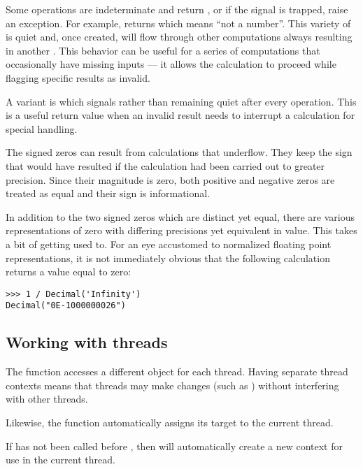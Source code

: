 Some operations are indeterminate and return , or if the
 signal is trapped, raise an exception.  For
example,  returns  which means ``not a number''.  This
variety of  is quiet and, once created, will flow through other
computations always resulting in another .  This behavior can be
useful for a series of computations that occasionally have missing inputs ---
it allows the calculation to proceed while flagging specific results as
invalid.     

A variant is  which signals rather than remaining quiet
after every operation.  This is a useful return value when an invalid
result needs to interrupt a calculation for special handling.

The signed zeros can result from calculations that underflow.
They keep the sign that would have resulted if the calculation had
been carried out to greater precision.  Since their magnitude is
zero, both positive and negative zeros are treated as equal and their
sign is informational.

In addition to the two signed zeros which are distinct yet equal,
there are various representations of zero with differing precisions
yet equivalent in value.  This takes a bit of getting used to.  For
an eye accustomed to normalized floating point representations, it
is not immediately obvious that the following calculation returns
a value equal to zero:          

\begin{verbatim}
>>> 1 / Decimal('Infinity')
Decimal("0E-1000000026")
\end{verbatim}

\subsection{Working with threads \label{decimal-threads}}

The  function accesses a different 
object for each thread.  Having separate thread contexts means that threads
may make changes (such as ) without interfering with
other threads.

Likewise, the  function automatically assigns its target
to the current thread.

If  has not been called before ,
then  will automatically create a new context for use
in the current thread.

